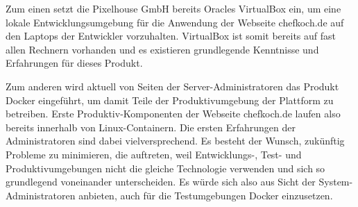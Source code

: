 Zum einen setzt die Pixelhouse GmbH bereits Oracles VirtualBox ein, um eine lokale Entwicklungsumgebung für die Anwendung der Webseite chefkoch.de auf den Laptops der Entwickler vorzuhalten. VirtualBox ist somit bereits auf fast allen Rechnern vorhanden und es existieren grundlegende Kenntnisse und Erfahrungen für dieses Produkt.

Zum anderen wird aktuell von Seiten der Server-Administratoren das Produkt Docker eingeführt, um damit Teile der Produktivumgebung der Plattform zu betreiben. Erste Produktiv-Komponenten der Webseite chefkoch.de laufen also bereits innerhalb von Linux-Containern. Die ersten Erfahrungen der Administratoren sind dabei vielversprechend. Es besteht der Wunsch, zukünftig Probleme zu minimieren, die auftreten, weil Entwicklungs-, Test- und Produktivumgebungen nicht die gleiche Technologie verwenden und sich so grundlegend voneinander unterscheiden. Es würde sich also aus Sicht der System-Administratoren anbieten, auch für die Testumgebungen Docker einzusetzen.
